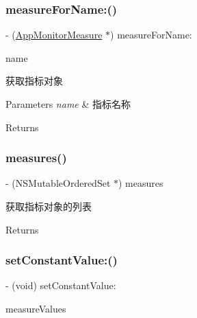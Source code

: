 \subsubsection{\texorpdfstring{measure\+For\+Name\+:()}{measureForName:()}}
{\footnotesize\ttfamily -\/ (\mbox{\hyperlink{interface_app_monitor_measure}{App\+Monitor\+Measure}} $\ast$) measure\+For\+Name\+: \begin{DoxyParamCaption}\item[{(N\+S\+String $\ast$)}]{name }\end{DoxyParamCaption}}

获取指标对象


\begin{DoxyParams}{Parameters}
{\em name} & 指标名称 \\
\hline
\end{DoxyParams}
\begin{DoxyReturn}{Returns}

\end{DoxyReturn}
\mbox{\label{interface_app_monitor_measure_set_a5a5ba0cebd83395a1b1ba9f66c868c21}} 
\subsubsection{\texorpdfstring{measures()}{measures()}}
{\footnotesize\ttfamily -\/ (N\+S\+Mutable\+Ordered\+Set $\ast$) measures \begin{DoxyParamCaption}{ }\end{DoxyParamCaption}}

获取指标对象的列表

\begin{DoxyReturn}{Returns}

\end{DoxyReturn}
\mbox{\label{interface_app_monitor_measure_set_a94e92d1fb4d82c1a32c59f4321945216}} 
\subsubsection{\texorpdfstring{set\+Constant\+Value\+:()}{setConstantValue:()}}
{\footnotesize\ttfamily -\/ (void) set\+Constant\+Value\+: \begin{DoxyParamCaption}\item[{(\mbox{\hyperlink{interface_app_monitor_measure_value_set}{App\+Monitor\+Measure\+Value\+Set}} $\ast$)}]{measure\+Values }\end{DoxyParamCaption}}

